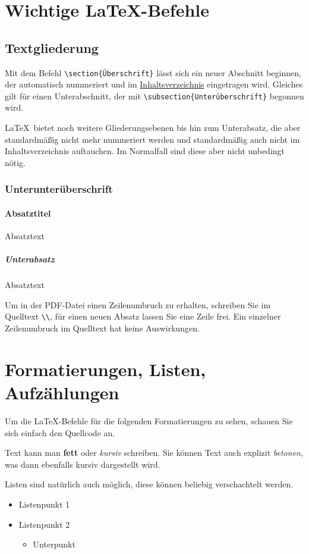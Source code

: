 \section{Wichtige \LaTeX-Befehle}
\subsection{Textgliederung}
Mit dem Befehl \verb|\section{Überschrift}| lässt sich ein neuer Abschnitt beginnen, der automatisch nummeriert und im \hyperref[toc]{Inhaltsverzeichnis} eingetragen wird.
Gleiches gilt für einen Unterabschnitt, der mit \verb|\subsection{Unterüberschrift}| begonnen wird.

\LaTeX\ bietet noch weitere Gliederungsebenen bis hin zum Unterabsatz, die aber standardmäßig nicht mehr nummeriert werden und standardmäßig auch nicht im Inhaltsverzeichnis auftauchen. Im Normalfall sind diese aber nicht unbedingt nötig.
\subsubsection{Unterunterüberschrift}
\paragraph{Absatztitel} Absatztext
\subparagraph{Unterabsatz} Absatztext

Um in der PDF-Datei einen Zeilenumbruch zu erhalten, schreiben Sie im Quelltext \verb|\\|, für einen neuen Absatz lassen Sie eine Zeile frei. Ein einzelner Zeilenumbruch im Quelltext hat keine Auswirkungen.

\section{Formatierungen, Listen, Aufzählungen}
Um die \LaTeX-Befehle für die folgenden Formatierungen zu sehen, schauen Sie sich einfach den Quellcode an.

Text kann man \textbf{fett} oder \textit{kursiv} schreiben. Sie können Text auch explizit \emph{betonen}, was dann ebenfalls kursiv dargestellt wird.

Listen sind natürlich auch möglich, diese können beliebig verschachtelt werden.
\begin{itemize}
\item Listenpunkt 1
\item Listenpunkt 2
\begin{itemize}
\item Unterpunkt
\end{itemize}
\end{itemize}

